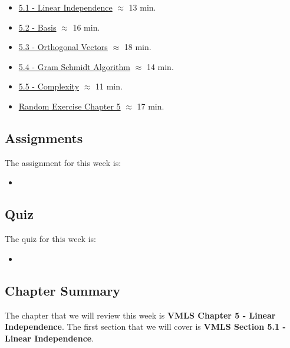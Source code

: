 \begin{itemize}
    \item \href{https://applied.cs.colorado.edu/mod/hvp/view.php?id=50717}{5.1 - Linear Independence} $\approx$ 13 min.
    \item \href{https://applied.cs.colorado.edu/mod/hvp/view.php?id=50718}{5.2 - Basis} $\approx$ 16 min.
    \item \href{https://applied.cs.colorado.edu/mod/hvp/view.php?id=50719}{5.3 - Orthogonal Vectors} $\approx$ 18 min.
    \item \href{https://applied.cs.colorado.edu/mod/hvp/view.php?id=50720}{5.4 - Gram Schmidt Algorithm} $\approx$ 14 min.
    \item \href{https://applied.cs.colorado.edu/mod/hvp/view.php?id=50721}{5.5 - Complexity} $\approx$ 11 min.
    \item \href{https://applied.cs.colorado.edu/mod/hvp/view.php?id=50722}{Random Exercise Chapter 5} $\approx$ 17 min.
\end{itemize}

\subsection{Assignments}

The assignment for this week is:

\begin{itemize}
    \item {}
\end{itemize}

\subsection{Quiz}

The quiz for this week is:

\begin{itemize}
    \item {}
\end{itemize}

\subsection{Chapter Summary}

The chapter that we will review this week is \textbf{VMLS Chapter 5 - Linear Independence}. The first section that we will cover is \textbf{VMLS Section 5.1 - Linear Independence}.

